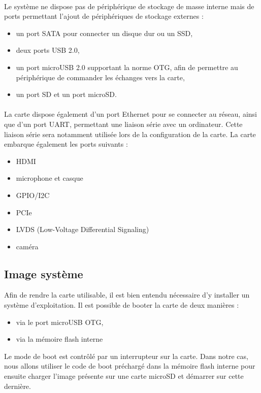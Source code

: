 \paragraph{}
Le système ne dispose pas de périphérique de stockage de masse interne mais de
ports permettant l'ajout de périphériques de stockage externes :
\begin{itemize}
\renewcommand{\labelitemi}{$\bullet$}
\item un port SATA pour connecter un disque dur ou un SSD,
\item deux ports USB 2.0,
\item un port microUSB 2.0 supportant la norme OTG, afin de permettre au 
  périphérique de commander les échanges vers la carte,
\item un port SD et un port microSD.
\end{itemize}

\paragraph{}
La carte dispose également d'un port Ethernet pour se connecter au réseau, ainsi
que d'un port UART, permettant une liaison série avec un ordinateur. Cette
liaison série sera notamment utilisée lors de la configuration de la carte. La
carte embarque également les ports suivants :
\begin{itemize}
\renewcommand{\labelitemi}{$\bullet$}
\item HDMI
\item microphone et casque
\item GPIO/I2C
\item PCIe
\item LVDS (Low-Voltage Differential Signaling)
\item caméra
\end{itemize}

\subsection{Image système}
Afin de rendre la carte utilisable, il est bien entendu nécessaire d'y installer
un système d'exploitation. Il est possible de booter la carte de deux manières :
\begin{itemize}
\renewcommand{\labelitemi}{$\bullet$}
\item via le port microUSB OTG,
\item via la mémoire flash interne
\end{itemize}
Le mode de boot est contrôlé par un interrupteur sur la carte. Dans notre cas,
nous allons utiliser le code de boot préchargé dans la mémoire flash interne
pour ensuite charger l'image présente sur une carte microSD et démarrer sur
cette dernière.

